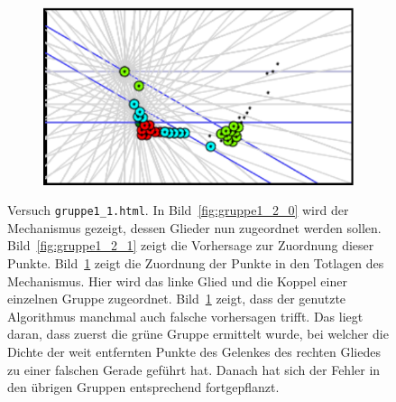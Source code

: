\begin{figure}
\begin{subfigure}[t]{0.24\textwidth}
        \caption{}
        \label{fig:gruppe1_2_2}
    \end{subfigure}
    \begin{subfigure}[t]{0.24\textwidth}
        \includegraphics[width=\textwidth]{gfx/gruppe1_2_3.png}
        \caption{}
        \label{fig:gruppe1_2_3}
    \end{subfigure}
    \caption[Versuch \lstinline{gruppe1_1.html}]{Versuch \lstinline{gruppe1_1.html}. In Bild~\ref{fig:gruppe1_2_0} wird der Mechanismus gezeigt, dessen Glieder nun zugeordnet werden sollen.
    Bild~\ref{fig:gruppe1_2_1} zeigt die Vorhersage zur Zuordnung dieser Punkte.
    Bild~\ref{fig:gruppe1_2_2} zeigt die Zuordnung der Punkte in den Totlagen des Mechanismus. Hier wird das linke Glied und die Koppel einer einzelnen Gruppe zugeordnet. Bild~\ref{fig:gruppe1_2_2} zeigt, dass der genutzte Algorithmus manchmal auch falsche vorhersagen trifft. Das liegt daran, dass zuerst die grüne Gruppe ermittelt wurde, bei welcher die Dichte der weit entfernten Punkte des Gelenkes des rechten Gliedes zu einer falschen Gerade geführt hat. Danach hat sich der Fehler in den übrigen Gruppen entsprechend fortgepflanzt.}
    \label{fig:gruppe1_2}
\end{figure}

